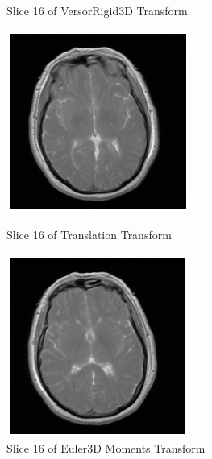 \documentclass[11pt,english]{article}
\begin{document}
\begin{figure}[h!]
\begin{minipage}[b]{0.2\textwidth}
          \caption{Slice 16 of VersorRigid3D Transform}
          \label{fig:versor}
        \end{minipage}
        \begin{minipage}[b]{0.2\textwidth}
            \includegraphics[width = \textwidth]{images/translationOverlap.PNG}
            \caption{Slice 16 of Translation Transform}
            \label{fig:translation}
          \end{minipage}
          \begin{minipage}[b]{0.2\textwidth}
            \includegraphics[width = \textwidth]{images/centeredMomentOverlap.PNG}
            \caption{Slice 16 of Euler3D Moments Transform}
            \label{fig:euler3D}
          \end{minipage}
      \end{figure}
\end{document}
